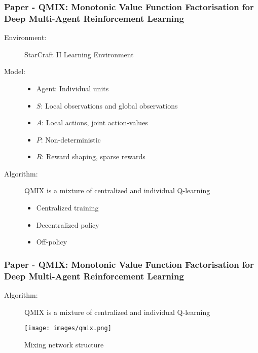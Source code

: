 \documentclass{beamer}
\begin{document}
\begin{frame}%
    \frametitle{Paper \thepapercounter - QMIX: Monotonic Value Function Factorisation for Deep 
    Multi-Agent Reinforcement Learning}
    \begin{description}
        \item[Environment:] StarCraft II Learning Environment\cite{vinyals2019}
        \item[Model:]
        \begin{itemize}
            \item Agent: Individual units
            \item $S$: Local observations and global observations
            \item $A$: Local actions, joint action-values
            \item $P$: Non-deterministic
            \item $R$: Reward shaping, sparse rewards
        \end{itemize}
        \item[Algorithm:] QMIX is a mixture of centralized and individual Q-learning
        \begin{itemize}
            \item Centralized training
            \item Decentralized policy
            \item Off-policy
        \end{itemize}
    \end{description}
\end{frame}

\begin{frame}%
    \frametitle{Paper \thepapercounter - QMIX: Monotonic Value Function Factorisation for Deep 
    Multi-Agent Reinforcement Learning\cite{rashid2018}}
    \begin{description}
        \item[Algorithm:] QMIX is a mixture of centralized and individual Q-learning
    \end{description}
    \begin{figure}\small
        \texttt{[image: images/qmix.png]}
        \caption{Mixing network structure\cite{rashid2018}}
    \end{figure}
\end{frame}
\end{document}
